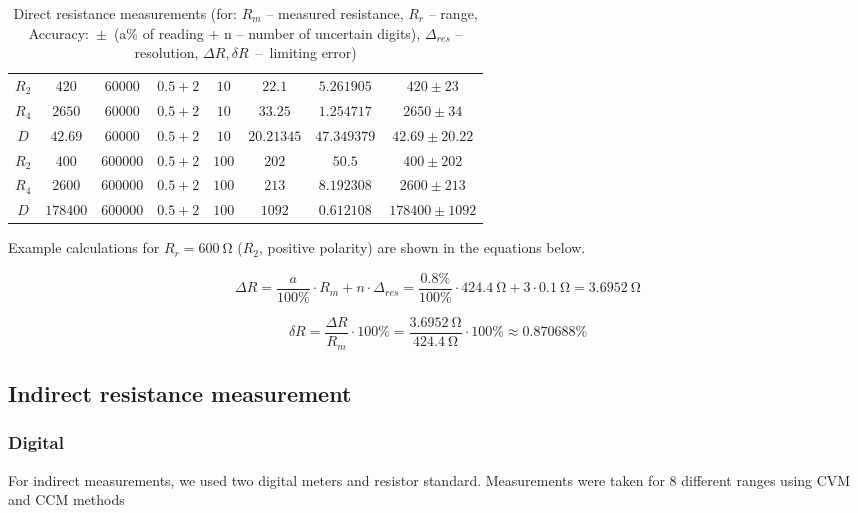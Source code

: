 \begin{table}[H]
\begin{tabular}{|  c | c | c | c | c | c | c | c |}
		\hline
		$R_2$ & $420$ & $60000$ & $0.5+2$ & $10$ & $22.1$ & $5.261905$ & $420 \pm 23$ \\
		$R_4$ & $2650$ & $60000$ & $0.5+2$ & $10$ & $33.25$ & $1.254717$ & $2650 \pm 34$ \\
		$D$ & $42.69$ & $60000$ & $0.5+2$ & $10$ & $20.21345$ & $47.349379$ & $42.69 \pm 20.22$ \\
		\hline
		$R_2$ & $400$ & $600000$ & $0.5+2$ & $100$ & $202$ & $50.5$ & $400 \pm 202$ \\
		$R_4$ & $2600$ & $600000$ & $0.5+2$ & $100$ & $213$ & $8.192308$ & $2600 \pm 213$ \\
		$D$ & $178400$ & $600000$ & $0.5+2$ & $100$ & $1092$ & $0.612108$ & $178400 \pm 1092$ \\
		\hline
	\end{tabular}
	\caption{Direct resistance measurements (for: $R_m$ -- measured resistance, $R_r$ -- range, Accuracy:~$\pm$~(a$\unit{\percent}$ of reading + n  -- number of uncertain digits), $\Delta_{res}$ -- resolution, $\Delta R, \delta R$~--~limiting error)}
	\label{tab:direct}
\end{table}

Example calculations for $R_r = \SI{600}{\ohm}$ ($R_2$, positive polarity) are shown in the equations below.

\begin{equation}
	\Delta R = \frac{a}{100\unit{\percent}}\cdot R_m + n\cdot \Delta_{res} = \frac{0.8\unit{\percent}}{100\unit{\percent}}\cdot\SI{424.4}{\ohm} + 3\cdot\SI{0.1}{\ohm} = \SI{3.6952}{\ohm}
\end{equation}

\begin{equation}
	\delta R = \frac{\Delta R}{R_m}\cdot 100\unit{\percent} = \frac{\SI{3.6952}{\ohm}}{\SI{424.4}{\ohm}}\cdot 100\unit{\percent}\approx 0.870688\unit{\percent}
\end{equation}

\subsection{Indirect resistance measurement}

\subsubsection{Digital}
For indirect measurements, we used two digital meters and resistor standard. Measurements were taken for 8 different ranges using CVM and CCM methods 

